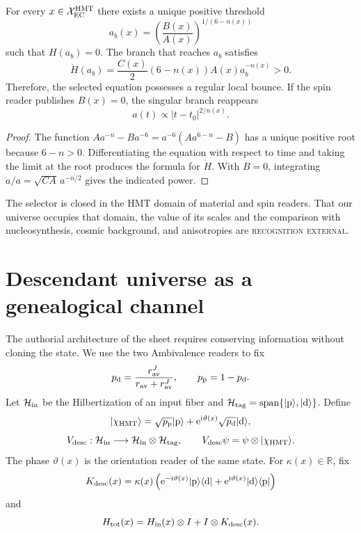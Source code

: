 \begin{theorem}
\label{thm:hmtf2-rebote-ec}
For every \(x\in\mathcal X_{\rm EC}^{\rm HMT}\) there exists a unique positive
threshold
\[
 a_b(x)
 =\left(\frac{B(x)}{A(x)}\right)^{1/(6-n(x))}
\]
such that \(H(a_b)=0\). The branch that reaches \(a_b\) satisfies
\[
 \dot H(a_b)
 =\frac{C(x)}2(6-n(x))A(x)a_b^{-n(x)}>0.
\]
Therefore, the selected equation possesses a regular local bounce. If the
spin reader publishes \(B(x)=0\), the singular branch reappears
\[
 a(t)\propto|t-t_0|^{2/n(x)}.
\]
\end{theorem}

\begin{proof}
The function
\(A a^{-n}-B a^{-6}=a^{-6}(Aa^{6-n}-B)\) has a unique positive root
because \(6-n>0\). Differentiating the equation with respect to time and taking the
limit at the root produces the formula for \(\dot H\). With \(B=0\),
integrating \(\dot a/a=\sqrt{CA}\,a^{-n/2}\) gives the indicated power.
\end{proof}

The selector is closed in the HMT domain of material and
spin readers. That our universe occupies that domain, the value of its scales and the
comparison with nucleosynthesis, cosmic background, and anisotropies are
\textsc{recognition external}.

\section{Descendant universe as a genealogical channel}
\label{sec:hmtf2-universo-descendiente}

The authorial architecture of the sheet requires conserving information without cloning the
state. We use the two Ambivalence readers to fix
\[
 p_{\rm d}
 =\frac{r_{\rm av}^J}{r_{\rm av}+r_{\rm av}^J},
 \qquad
 p_{\rm p}=1-p_{\rm d}.
\]
Let \(\mathcal H_{\rm in}\) be the Hilbertization of an input fiber and
\(\mathcal H_{\rm tag}=\operatorname{span}\{|{\rm p}\rangle,|{\rm d}\rangle\}\).
Define
\[
 |\chi_{\rm HMT}\rangle
 =\sqrt{p_{\rm p}}|{\rm p}\rangle
 +\mathrm e^{{\rm i}\vartheta(x)}
  \sqrt{p_{\rm d}}|{\rm d}\rangle,
\]
\[
 V_{\rm desc}:\mathcal H_{\rm in}
 \longrightarrow\mathcal H_{\rm in}\otimes\mathcal H_{\rm tag},
 \qquad
 V_{\rm desc}\psi=\psi\otimes|\chi_{\rm HMT}\rangle.
\]
The phase \(\vartheta(x)\) is the orientation reader of the same state. For
\(\kappa(x)\in\mathbb R\), fix
\[
 K_{\rm desc}(x)
 =\kappa(x)
 \left(
 \mathrm e^{-{\rm i}\vartheta(x)}
 |{\rm p}\rangle\langle{\rm d}|
 +\mathrm e^{{\rm i}\vartheta(x)}
 |{\rm d}\rangle\langle{\rm p}|
 \right)
\]
and
\[
 H_{\rm tot}(x)
 =H_{\rm in}(x)\otimes I+I\otimes K_{\rm desc}(x).
\]

